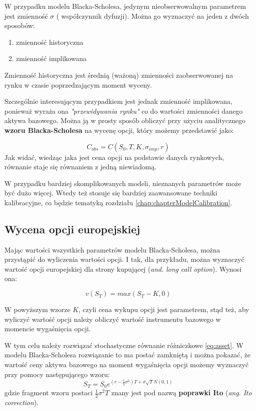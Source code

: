 \documentclass{pracamgr}
\begin{document}
W przypadku modelu Blacka-Scholesa, jedynym nieobserwowalnym parametrem jest zmienność $\sigma$ (
współczynnik dyfuzji). Można go wyznaczyć na jeden z dwóch sposobów:
\begin{enumerate}
  \item zmienność historyczna
  \item zmienność implikowana
\end{enumerate}

Zmienność historyczna jest średnią (ważoną) zmienności zaobserwowanej na rynku w czasie 
poprzedzającym moment wyceny.

Szczególnie interesującym przypadkiem jest jednak zmienność implikowana, ponieważ 
wyraża ona \textit{"przewidywania rynku"} co do wartości zmienności danego aktywa bazowego. 
Można ją w prosty sposób obliczyć przy użyciu analitycznego \textbf{wzoru Blacka-Scholesa} na 
wycenę opcji, który możemy przedstawić jako:

\begin{equation}
  C_{obs} = C(S_0, T, K, \sigma_{imp}, r)
\end{equation}
Jak widać, wiedząc jaka jest cena opcji na podstawie danych rynkowych, równanie staje się równaniem z jedną niewiadomą. 

W przypadku bardziej skomplikowanych modeli, nieznanych parametrów może być dużo więcej. Wtedy też 
stosuje się bardziej zaawansowane techniki kalibracyjne, co będzie tematyką rozdziału \ref{chap:chapterModelCalibration}.


\subsection{Wycena opcji europejskiej} %
\label{sub:subsection_name}
 
Mając wartości wszystkich parametrów modelu Blacka-Scholesa, można przystąpić
do wyliczenia wartości opcji. I tak, dla przykładu, można wyznaczyć wartość opcji europejskiej dla strony kupującej 
(\textit{and. long call option}). Wynosi ona:

\begin{equation}
  v(S_T) = max(S_T-K, 0)
\end{equation}

W powyższym wzorze $K$, czyli cena wykupu opcji jest parametrem, stąd też, aby 
wyliczyć wartość opcji należy obliczyć wartość instrumentu bazowego w momencie wygaśnięcia opcji.

W tym celu należy rozwiązać stochastyczne równanie różniczkowe \ref{eq:asset}. W modelu Blacka-Scholesa rozwiązanie to ma
postać zamkniętą i można pokazać, że wartość ceny aktywa bazowego na moment wygaśnięcia opcji możemy wyznaczyć przy 
pomocy następującego wzoru:
\begin{equation}
\label{eq:closedFormBlack} 
  S_T = S_0 e^{(r - \frac{1}{2} \sigma^2)T+\sigma \sqrt{T} N(0,1)}
\end{equation}
gdzie fragment wzoru postaci $\frac{1}{2} \sigma^2 T$ znany jest pod 
nazwą \textbf{poprawki Ito} (\textit{ang. Ito correction}).
\end{document}
